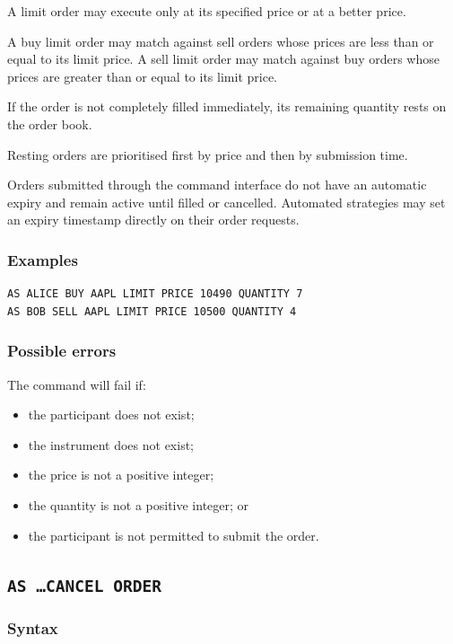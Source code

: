 \documentclass{article}
\begin{document}
A limit order may execute only at its specified price or at a better
price.

A buy limit order may match against sell orders whose prices are less
than or equal to its limit price. A sell limit order may match against
buy orders whose prices are greater than or equal to its limit price.

If the order is not completely filled immediately, its remaining
quantity rests on the order book.

Resting orders are prioritised first by price and then by submission
time.

Orders submitted through the command interface do not have an automatic
expiry and remain active until filled or cancelled. Automated strategies may
set an expiry timestamp directly on their order requests.

\subsubsection*{Examples}

\begin{lstlisting}
AS ALICE BUY AAPL LIMIT PRICE 10490 QUANTITY 7
AS BOB SELL AAPL LIMIT PRICE 10500 QUANTITY 4
\end{lstlisting}

\subsubsection*{Possible errors}

The command will fail if:

\begin{itemize}
    \item the participant does not exist;
    \item the instrument does not exist;
    \item the price is not a positive integer;
    \item the quantity is not a positive integer; or
    \item the participant is not permitted to submit the order.
\end{itemize}

\subsection{\texttt{AS \ldots CANCEL ORDER}}

\subsubsection*{Syntax}
\end{document}
